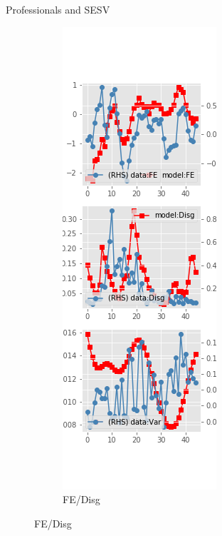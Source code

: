 \documentclass{beamer}
\begin{document}
\begin{frame}{Professionals and SESV}
\begin{figure}[ht]
\begin{subfigure}[b]{0.2\textwidth}
		\end{subfigure}
		\hfill
		\begin{subfigure}[b]{0.2\textwidth}
			\caption{FE/Disg}
			\includegraphics[width=\textwidth, height = 0.8\textheight]{figuresDraft/spf_se_est_sv_diag2.png}

\end{subfigure}
\end{figure}
\end{frame}
\end{document}
